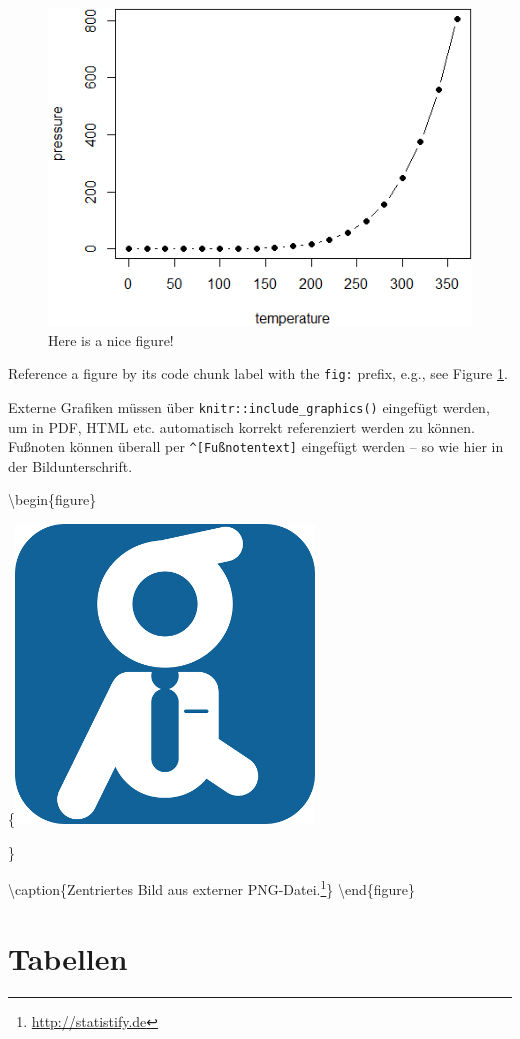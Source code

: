 \documentclass[]{book}
\let\rmarkdownfootnote\footnote%
\def\footnote{\protect\rmarkdownfootnote}
\theoremstyle{definition}
\theoremstyle{definition}
\theoremstyle{remark}
\begin{document}
\begin{figure}

{\centering \includegraphics[width=0.8\linewidth]{img/nice-fig-1} 

}

\caption{Here is a nice figure!}\label{fig:nice-fig}
\end{figure}

Reference a figure by its code chunk label with the \texttt{fig:}
prefix, e.g., see Figure \ref{fig:nice-fig}.

Externe Grafiken müssen über \texttt{knitr::include\_graphics()}
eingefügt werden, um in PDF, HTML etc. automatisch korrekt referenziert
werden zu können. Fußnoten können überall per
\texttt{\^{}{[}Fußnotentext{]}} eingefügt werden -- so wie hier in der
Bildunterschrift.

\textbackslash{}begin\{figure\}

\{\centering \includegraphics[width=0.328\linewidth]{img/important}

\}

\textbackslash{}caption\{Zentriertes Bild aus externer
PNG-Datei.\footnote{\url{http://statistify.de}}\}\label{fig:externalImage}
\textbackslash{}end\{figure\}

\section{Tabellen}\label{tabellen}
\end{document}
